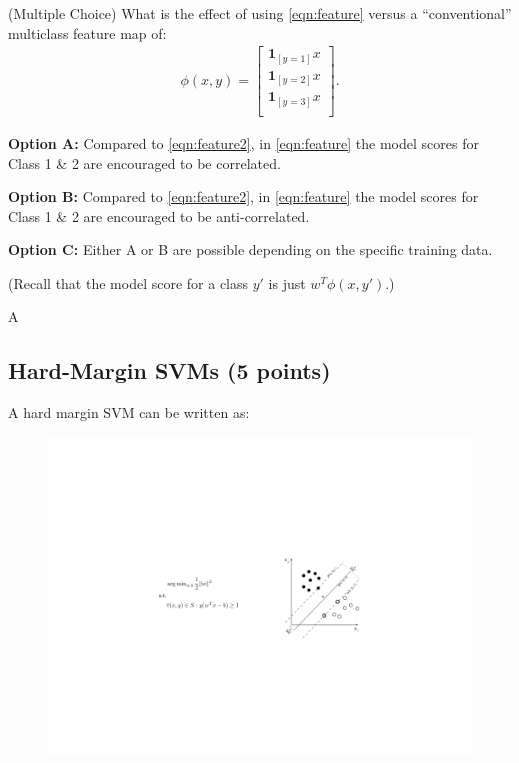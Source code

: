 \question (Multiple Choice) What is the effect of using \eqref{eqn:feature} versus a ``conventional'' multiclass feature map of:
\begin{eqnarray}
\phi(x,y) = \left[\begin{array}{c}
\textbf{1}_{[y=1]} x\\
\textbf{1}_{[y=2]} x\\
\textbf{1}_{[y=3]} x\\
\end{array}\right].
   \label{eqn:feature2}
   \end{eqnarray}

\textbf{Option A:} Compared to \eqref{eqn:feature2}, in \eqref{eqn:feature} the model scores for Class 1 \& 2 are encouraged to be correlated.
\smallskip

\textbf{Option B:} Compared to \eqref{eqn:feature2}, in \eqref{eqn:feature} the model scores for Class 1 \& 2 are encouraged to be anti-correlated.
\smallskip

\textbf{Option C:} Either A or B are possible depending on the specific training data.
\smallskip

(Recall that the model score for a class $y'$ is just $w^T\phi(x,y')$.)

\begin{solution}
A
\end{solution}

\smallskip

\subsection{Hard-Margin SVMs (5 points)}

A hard margin SVM can be written as:
\begin{figure}[h]
\vspace{-0.12in}
\centering
\includegraphics[scale=1.65]{image/svm2.pdf}
\vspace{-0.1in}
\end{figure}

